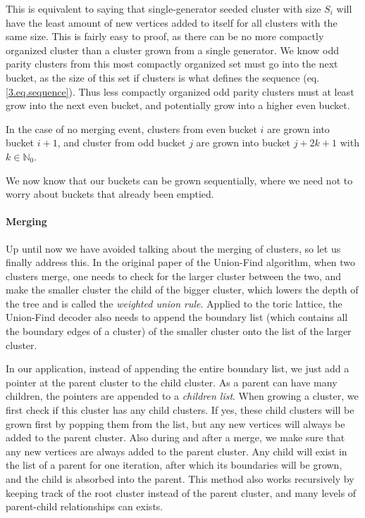 This is equivalent to saying that single-generator seeded cluster with size $S_i$ will have the least amount of new vertices added to itself for all clusters with the same size. This is fairly easy to proof, as there can be no more compactly organized cluster than a cluster grown from a single generator. We know odd parity clusters from this most compactly organized set must go into the next bucket, as the size of this set if clusters is what defines the sequence (eq. \ref{3.eq.sequence}). Thus less compactly organized odd parity clusters must at least grow into the next even bucket, and potentially grow into a higher even bucket.

\begin{lemma}
  In the case of no merging event, clusters from even bucket $i$ are grown into bucket $i+1$, and cluster from odd bucket $j$ are grown into bucket $j+2k+1$ with $k \in \mathbb{N}_0$.
\end{lemma}

We now know that our buckets can be grown sequentially, where we need not to worry about buckets that already been emptied.

\paragraph{Merging}
Up until now we have avoided talking about the merging of clusters, so let us finally address this. In the original paper of the Union-Find algorithm, when two clusters merge, one needs to check for the larger cluster between the two, and make the smaller cluster the child of the bigger cluster, which lowers the depth of the tree and is called the \emph{weighted union rule}. Applied to the toric lattice, the Union-Find decoder also needs to append the boundary list (which contains all the boundary edges of a cluster) of the smaller cluster onto the list of the larger cluster.

In our application, instead of appending the entire boundary list, we just add a pointer at the parent cluster to the child cluster. As a parent can have many children, the pointers are appended to a \emph{children list}. When growing a cluster, we first check if this cluster has any child clusters. If yes, these child clusters will be grown first by popping them from the list, but any new vertices will always be added to the parent cluster. Also during and after a merge, we make sure that any new vertices are always added to the parent cluster. Any child will exist in the list of a parent for one iteration, after which its boundaries will be grown, and the child is absorbed into the parent. This method also works recursively by keeping track of the root cluster instead of the parent cluster, and many levels of parent-child relationships can exists.

